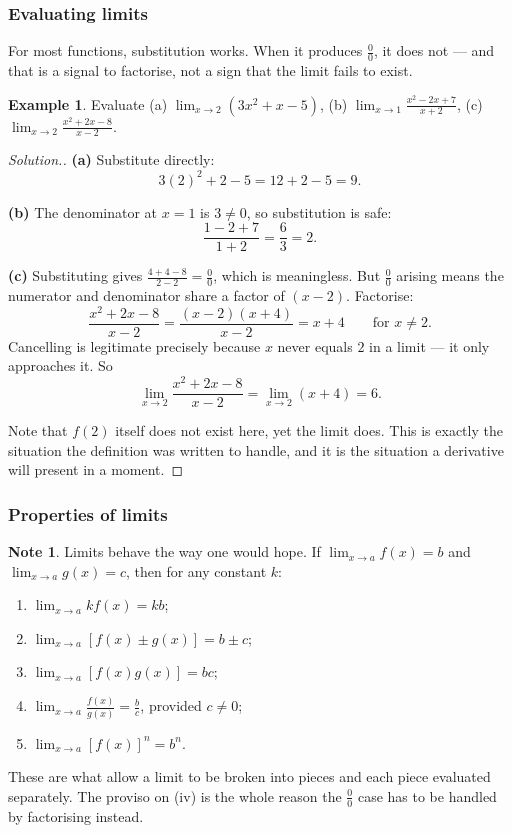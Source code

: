 \documentclass[11pt,a4paper]{article}
\theoremstyle{definition}
\newtheorem{example}[thm]{Example}
\newtheorem{note}[thm]{Note}
\newenvironment{solution}
  {\renewcommand{\qedsymbol}{}\begin{proof}[\textit{Solution}.]}
  {\end{proof}}
\begin{document}
\subsubsection{Evaluating limits}

For most functions, substitution works. When it produces $\frac{0}{0}$, it does not ---
and that is a signal to factorise, not a sign that the limit fails to exist.

\begin{example}
Evaluate (a) $\displaystyle\lim_{x\to 2}\left(3x^2+x-5\right)$, \quad
(b) $\displaystyle\lim_{x\to 1}\frac{x^2-2x+7}{x+2}$, \quad
(c) $\displaystyle\lim_{x\to 2}\frac{x^2+2x-8}{x-2}$.
\end{example}

\begin{solution}
\textbf{(a)} Substitute directly:
$$3(2)^2+2-5=12+2-5=9.$$

\textbf{(b)} The denominator at $x=1$ is $3\neq 0$, so substitution is safe:
$$\frac{1-2+7}{1+2}=\frac{6}{3}=2.$$

\textbf{(c)} Substituting gives $\frac{4+4-8}{2-2}=\frac{0}{0}$, which is meaningless.
But $\frac{0}{0}$ arising means the numerator and denominator share a factor of
$(x-2)$. Factorise:
$$\frac{x^2+2x-8}{x-2}=\frac{(x-2)(x+4)}{x-2}=x+4\qquad\text{for } x\neq 2.$$
Cancelling is legitimate precisely because $x$ never equals $2$ in a limit --- it only
approaches it. So
$$\lim_{x\to 2}\frac{x^2+2x-8}{x-2}=\lim_{x\to 2}(x+4)=6.$$

Note that $f(2)$ itself does not exist here, yet the limit does. This is exactly the
situation the definition was written to handle, and it is the situation a derivative
will present in a moment.
\end{solution}

\subsubsection{Properties of limits}

\begin{note}
Limits behave the way one would hope. If $\lim_{x\to a}f(x)=b$ and
$\lim_{x\to a}g(x)=c$, then for any constant $k$:
\begin{enumerate}
\item[(i).] $\lim_{x\to a}kf(x)=kb$;
\item[(ii).] $\lim_{x\to a}\left[f(x)\pm g(x)\right]=b\pm c$;
\item[(iii).] $\lim_{x\to a}\left[f(x)g(x)\right]=bc$;
\item[(iv).] $\lim_{x\to a}\frac{f(x)}{g(x)}=\frac{b}{c}$, provided $c\neq 0$;
\item[(v).] $\lim_{x\to a}\left[f(x)\right]^n=b^n$.
\end{enumerate}
These are what allow a limit to be broken into pieces and each piece evaluated
separately. The proviso on (iv) is the whole reason the $\frac{0}{0}$ case has to be
handled by factorising instead.
\end{note}
\end{document}
